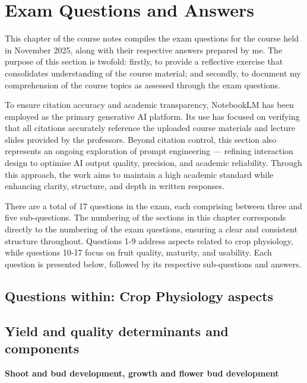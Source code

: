 \chapter{Exam Questions and Answers}
\setlength{\headheight}{12.71342pt}
\addtolength{\topmargin}{-0.71342pt}

This chapter of the course notes compiles the exam questions for the course held in November 2025, along with their respective answers prepared by me. The purpose of this section is twofold: firstly, to provide a reflective exercise that consolidates understanding of the course material; and secondly, to document my comprehension of the course topics as assessed through the exam questions.

\vspace{1em}
To ensure citation accuracy and academic transparency, NotebookLM has been employed as the primary generative AI platform. Its use has focused on verifying that all citations accurately reference the uploaded course materials and lecture slides provided by the professors. Beyond citation control, this section also represents an ongoing exploration of prompt engineering — refining interaction design to optimise AI output quality, precision, and academic reliability. Through this approach, the work aims to maintain a high academic standard while enhancing clarity, structure, and depth in written responses.

\vspace{1em}
There are a total of 17 questions in the exam, each comprising between three and five sub-questions. The numbering of the sections in this chapter corresponds directly to the numbering of the exam questions, ensuring a clear and consistent structure throughout. Questions 1-9 address aspects related to crop physiology, while questions 10-17 focus on fruit quality, maturity, and usability. Each question is presented below, followed by its respective sub-questions and answers.

\section*{Questions within: Crop Physiology aspects}

\section{Yield and quality determinants and components}
\textbf{Shoot and bud development, growth and flower bud development}

